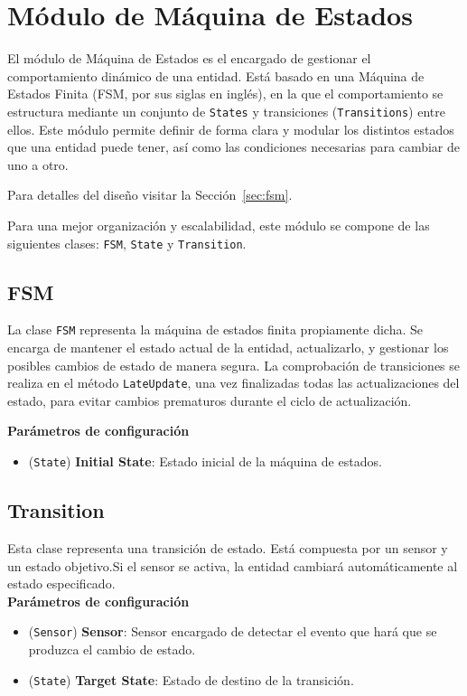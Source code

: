 \section{Módulo de Máquina de Estados}

El módulo de Máquina de Estados es el encargado de gestionar el comportamiento dinámico de una entidad. Está basado en una Máquina de Estados Finita (FSM, por sus siglas en inglés), en la que el comportamiento se estructura mediante un conjunto de \texttt{States} y transiciones (\texttt{Transitions}) entre ellos. Este módulo permite definir de forma clara y modular los distintos estados que una entidad puede tener, así como las condiciones necesarias para cambiar de uno a otro. 

Para detalles del diseño visitar la Sección~\ref{sec:fsm}.

Para una mejor organización y escalabilidad, este módulo se compone de las siguientes clases: \texttt{FSM}, \texttt{State} y \texttt{Transition}. 

\subsection{FSM}

La clase \texttt{FSM} representa la máquina de estados finita propiamente dicha. Se encarga de mantener el estado actual de la entidad, actualizarlo, y gestionar los posibles cambios de estado de manera segura. La comprobación de transiciones se realiza en el método \texttt{LateUpdate}, una vez finalizadas todas las actualizaciones del estado, para evitar cambios prematuros durante el ciclo de actualización.

\textbf{Parámetros de configuración}
\begin{itemize}
	\item (\texttt{State}) \textbf{Initial State}: Estado inicial de la máquina de estados.
\end{itemize}

\subsection{Transition}
Esta clase representa una transición de estado. Está compuesta por un sensor y un estado objetivo.Si el sensor se activa, la entidad cambiará automáticamente al estado especificado.\\

\textbf{Parámetros de configuración}
\begin{itemize}
	\item (\texttt{Sensor}) \textbf{Sensor}: Sensor encargado de detectar el evento que hará que se produzca el cambio de estado.
	\item (\texttt{State}) \textbf{Target State}: Estado de destino de la transición.
\end{itemize}

